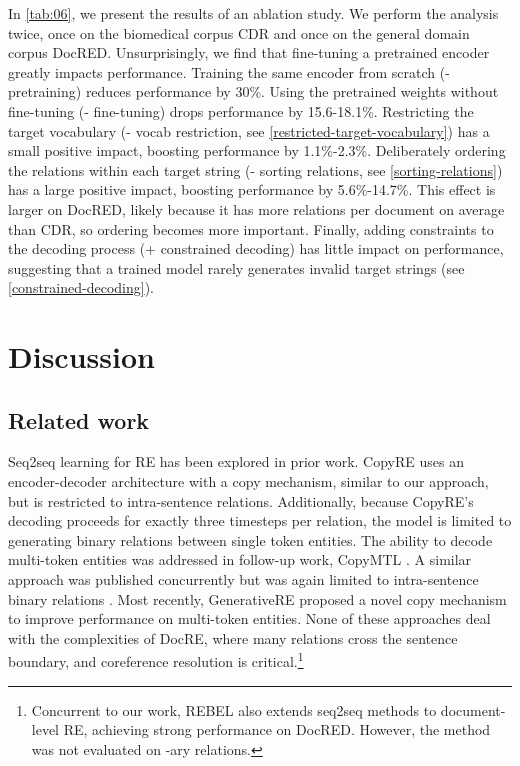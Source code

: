 \documentclass[11pt]{article}
\begin{document}
In \autoref{tab:06}, we present the results of an ablation study. We perform the analysis twice, once on the biomedical corpus CDR and once on the general domain corpus DocRED. Unsurprisingly, we find that fine-tuning a pretrained encoder greatly impacts performance. Training the same encoder from scratch (- pretraining) reduces performance by 30\%. Using the pretrained weights without fine-tuning (- fine-tuning) drops performance by 15.6-18.1\%. Restricting the target vocabulary (- vocab restriction, see \textsection \ref{restricted-target-vocabulary}) has a small positive impact, boosting performance by 1.1\%-2.3\%. Deliberately ordering the relations within each target string (- sorting relations, see \textsection\ref{sorting-relations}) has a large positive impact, boosting performance by 5.6\%-14.7\%. This effect is larger on DocRED, likely because it has more relations per document on average than CDR, so ordering becomes more important. Finally, adding constraints to the decoding process (+ constrained decoding) has little impact on performance, suggesting that a trained model rarely generates invalid target strings (see \textsection \ref{constrained-decoding}).

\section{Discussion}

\subsection{Related work}

Seq2seq learning for RE has been explored in prior work. CopyRE \citep{zeng-etal-2018-extracting} uses an encoder-decoder architecture with a copy mechanism, similar to our approach, but is restricted to intra-sentence relations. Additionally, because CopyRE's decoding proceeds for exactly three timesteps per relation, the model is limited to generating binary relations between single token entities. The ability to decode multi-token entities was addressed in follow-up work, CopyMTL \citep{Zeng2020CopyMTLCM}. A similar approach was published concurrently but was again limited to intra-sentence binary relations \citep{nayak2020effective}. Most recently, GenerativeRE \citep{cao-ananiadou-2021-generativere-incorporating} proposed a novel copy mechanism to improve performance on multi-token entities. None of these approaches deal with the complexities of DocRE, where many relations cross the sentence boundary, and coreference resolution is critical.\footnote{Concurrent to our work, REBEL \citep{huguet-cabot-navigli-2021-rebel-relation} also extends seq2seq methods to document-level RE, achieving strong performance on DocRED. However, the method was not evaluated on -ary relations.}
\end{document}
